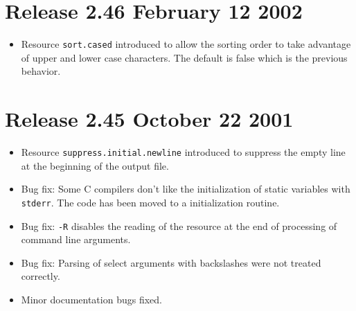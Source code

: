 \documentclass[11pt,a4paper]{scrartcl}
\newcommand\rsc[1]{\texttt{#1}}
\newenvironment{Release}[2]{%
  \def\tmp{#2}%
  \section*{Release #1 \ifx\tmp\empty\else{\normalsize[#2]}\fi}
  \begin{itemize}
}{\end{itemize}}
\newenvironment{Fix}[1]{\item }{}
\newenvironment{New}[1]{\item }{}
\newenvironment{Doc}[1]{\item }{}
\begin{document}
\begin{multicols}
 \begin{Release}{2.46}{February 12 2002}
  \begin{New}{gene}
    Resource \rsc{sort.cased} introduced to allow the sorting order to
    take advantage of upper and lower case characters. The default is
    false which is the previous behavior.
  \end{New}
 \end{Release}

 \begin{Release}{2.45}{October 22 2001}
  \begin{New}{gene}
    Resource \rsc{suppress.initial.newline} introduced to suppress the
    empty line at the beginning of the output file.
  \end{New}
  \begin{Fix}{gene}
    Bug fix: Some C compilers don't like the initialization of static
    variables with \texttt{stderr}. The code has been moved to a
    initialization routine.
  \end{Fix}
  \begin{Fix}{gene}
    Bug fix: \texttt{-R} disables the reading of the resource at the
    end of processing of command line arguments.
  \end{Fix}
  \begin{Fix}{gene}
    Bug fix: Parsing of select arguments with backslashes were not treated
    correctly.
  \end{Fix}
  \begin{Doc}{gene}
    Minor documentation bugs fixed.
  \end{Doc}
 \end{Release}


\end{multicols}
\end{document}
